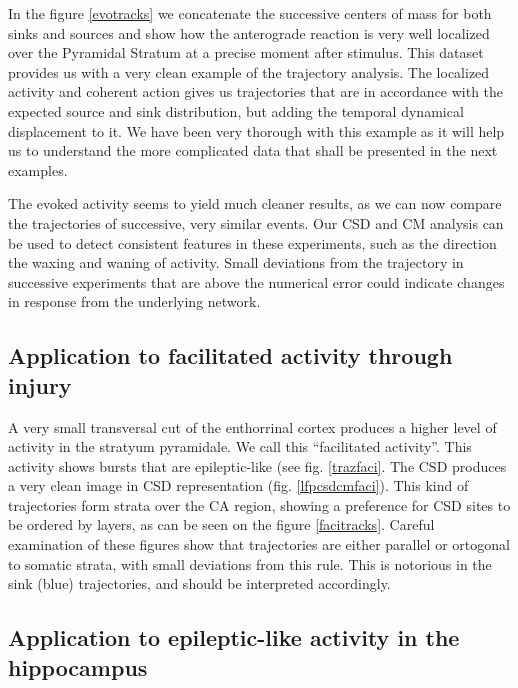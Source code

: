 \documentclass[utf8]{frontiersSCNS}
\begin{document}
In the figure \ref{evotracks} we concatenate the successive centers of mass
for both sinks and sources and show how the anterograde reaction is
very well localized over the Pyramidal Stratum at a precise moment after
stimulus. This dataset provides us with a very clean example of the
trajectory analysis. The localized activity and coherent
action gives us trajectories that are in accordance with the expected
source and sink distribution, but adding the temporal dynamical displacement
to it. We have been very thorough with this example as it will help us
to understand the more complicated data that shall be presented in
the next examples. 

The evoked activity seems to yield much cleaner results, as we can now compare the trajectories of successive, very similar events. Our CSD and CM analysis can be used to detect consistent features in these experiments, such as the direction the waxing and waning of activity. Small deviations from the trajectory in successive experiments that are above the numerical error could indicate changes in response from
the underlying network. 





\subsection{Application to facilitated activity through injury}

A very small transversal cut of the enthorrinal cortex produces
a higher level of activity in the stratyum pyramidale. We call
this ``facilitated activity''. This activity shows bursts
that are epileptic-like (see fig. \ref{trazfaci}.
The CSD produces a very clean
image in CSD representation (fig. \ref{lfpcsdcmfaci}). 
This kind of trajectories form strata over the CA region,
showing a preference for CSD sites to be ordered by layers,
as can be seen on the figure \ref{facitracks}.
Careful examination of these figures show that trajectories
are either parallel or ortogonal to somatic strata, with small
deviations from this rule. This is notorious in the sink (blue)
trajectories, and should be interpreted accordingly.




\subsection{Application to epileptic-like activity in the hippocampus}
\end{document}
